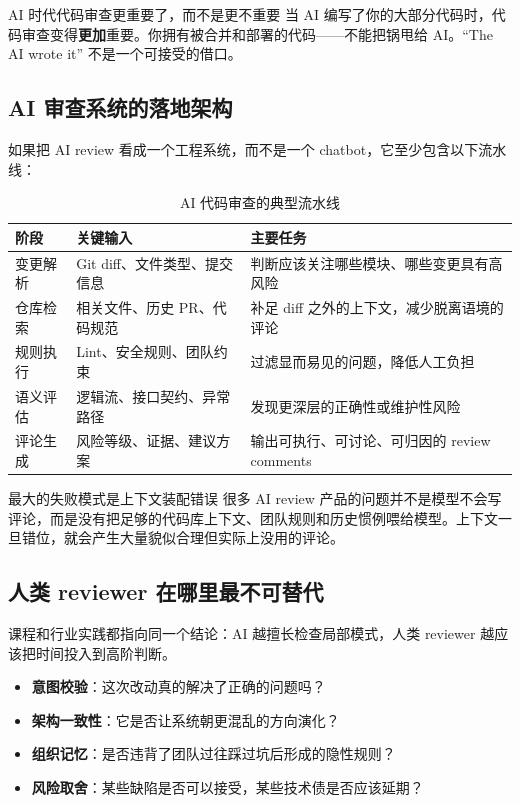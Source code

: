 \begin{warningbox}{AI 时代代码审查更重要了，而不是更不重要}
当 AI 编写了你的大部分代码时，代码审查变得\textbf{更加}重要。你拥有被合并和部署的代码——不能把锅甩给 AI。``The AI wrote it'' 不是一个可接受的借口。
\end{warningbox}

\subsection{AI 审查系统的落地架构}

如果把 AI review 看成一个工程系统，而不是一个 chatbot，它至少包含以下流水线：

\begin{table}[H]
\centering
\begin{tabular}{p{} p{} p{}}
\toprule
阶段 & 关键输入 & 主要任务 \\
\midrule
变更解析 & Git diff、文件类型、提交信息 & 判断应该关注哪些模块、哪些变更具有高风险 \\
仓库检索 & 相关文件、历史 PR、代码规范 & 补足 diff 之外的上下文，减少脱离语境的评论 \\
规则执行 & Lint、安全规则、团队约束 & 过滤显而易见的问题，降低人工负担 \\
语义评估 & 逻辑流、接口契约、异常路径 & 发现更深层的正确性或维护性风险 \\
评论生成 & 风险等级、证据、建议方案 & 输出可执行、可讨论、可归因的 review comments \\
\bottomrule
\end{tabular}
\caption{AI 代码审查的典型流水线}
\end{table}

\begin{warningbox}{最大的失败模式是上下文装配错误}
很多 AI review 产品的问题并不是模型不会写评论，而是没有把足够的代码库上下文、团队规则和历史惯例喂给模型。上下文一旦错位，就会产生大量貌似合理但实际上没用的评论。
\end{warningbox}

\subsection{人类 reviewer 在哪里最不可替代}

课程和行业实践都指向同一个结论：AI 越擅长检查局部模式，人类 reviewer 越应该把时间投入到高阶判断。

\begin{itemize}
    \item \textbf{意图校验}：这次改动真的解决了正确的问题吗？
    \item \textbf{架构一致性}：它是否让系统朝更混乱的方向演化？
    \item \textbf{组织记忆}：是否违背了团队过往踩过坑后形成的隐性规则？
    \item \textbf{风险取舍}：某些缺陷是否可以接受，某些技术债是否应该延期？
\end{itemize}

